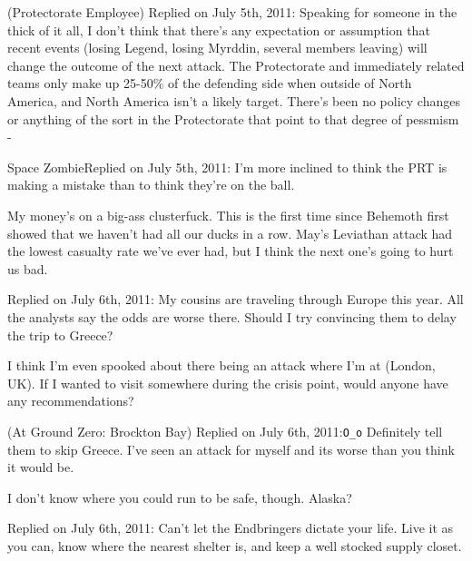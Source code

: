 


\blacktriangleright  {}(Protectorate Employee)
Replied on July 5th, 2011:
Speaking for someone in the thick of it all, I don't think that there's any expectation or assumption that recent events (losing Legend, losing Myrddin, several members leaving) will change the outcome of the next attack.  The Protectorate and immediately related teams only make up 25-50\% of the defending side when outside of North America, and North America isn't a likely target.  There's been no policy changes or anything of the sort in the Protectorate that point to that degree of pessmism
-\Mercury



\blacktriangleright  Space ZombieReplied on July 5th, 2011:
I'm more inclined to think the PRT is making a mistake than to think they're on the ball.



My money's on a big-ass clusterfuck.  This is the first time since Behemoth first showed that we haven't had all our ducks in a row.  May's Leviathan attack had the lowest casualty rate we've ever had, but I think the next one's going to hurt us bad.



\blacktriangleright  {}
Replied on July 6th, 2011:
My cousins are traveling through Europe this year.  All the analysts say the odds are worse there.  Should I try convincing them to delay the trip to Greece?



I think I'm even spooked about there being an attack where I'm at (London, UK).  If I wanted to visit somewhere during the crisis point, would anyone have any recommendations?



\blacktriangleright  {} (At Ground Zero: Brockton Bay)
Replied on July 6th, 2011:\texttt{O_o}  Definitely tell them to skip Greece.  I've seen an attack for myself and its worse than you think it would be.



I don't know where you could run to be safe, though.  Alaska?



\blacktriangleright  {}
Replied on July 6th, 2011:
Can't let the Endbringers dictate your life.  Live it as you can, know where the nearest shelter is, and keep a well stocked supply closet.



